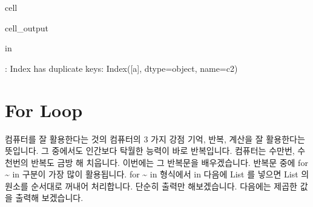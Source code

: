 \documentclass[letterpaper,10pt,english]{jupyterBook}
\begin{document}
\begin{sphinxuseclass}{cell}
\begin{sphinxVerbatimOutput}
\begin{sphinxuseclass}{cell_output}
\begin{sphinxVerbatim}[commandchars=\\\{\}]
 in 
             
               \PYG{p}{[}\PYG{p}{]}
              
         

: Index has duplicate keys: Index([\PYGZsq{}a\PYGZsq{}], dtype=\PYGZsq{}object\PYGZsq{}, name=\PYGZsq{}c2\PYGZsq{})
\end{sphinxVerbatim}

\end{sphinxuseclass}\end{sphinxVerbatimOutput}

\end{sphinxuseclass}

\part{For Loop}
\label{\detokenize{chapter2/2.1.3_Python_Basics:for-loop}}\label{\detokenize{chapter2/2.1.3_Python_Basics::doc}}
\sphinxAtStartPar
컴퓨터를 잘 활용한다는 것의 컴퓨터의 3 가지 강점 \sphinxhyphen{} 기억, 반복, 계산을 잘 활용한다는 뜻입니다. 그 중에서도 인간보다 탁월한 능력이 바로 반복입니다. 컴퓨터는 수만번, 수천번의 반복도 금방 해 치웁니다. 이번에는 그 반복문을 배우겠습니다. 반복문 중에 for \textasciitilde{} in 구분이 가장 많이 활용됩니다. for \textasciitilde{} in 형식에서 in 다음에 List 를 넣으면 List 의 원소를 순서대로 꺼내어 처리합니다. 단순히 출력만 해보겠습니다. 다음에는 제곱한 값을 출력해 보겠습니다.
\end{document}
